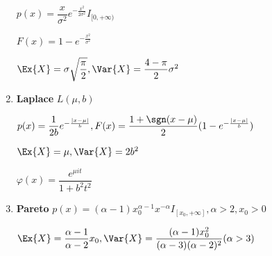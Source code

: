 \begin{enumerate}
$ p(x) = \dfrac{x}{\sigma^2}e^{-\frac{x^2}{2\sigma^2}}I_{[0,+\infty)}$

$ F(x) = 1-e^{-\frac{x^2}{\sigma^2}}$

$ \Ex{X} = \sigma\sqrt{\dfrac{\pi}{2}}, \Var{X} = \dfrac{4-\pi}{2}\sigma^2$

\item \textbf{Laplace} $ L(\mu,b)$

  $ p(x)=\dfrac{1}{2b}e^{-\frac{|x-\mu|}{b}}, F(x)=\dfrac{1+\sgn(x-\mu)}{2}(1-e^{-\frac{|x-\mu|}{b}})$

  $ \Ex{X} = \mu, \Var{X} = 2b^2$

  $ \varphi(x) = \dfrac{e^{\mu it}}{1+b^2t^2}$


\item \textbf{Pareto}
  $ p(x) = (\alpha-1)x_0^{\alpha-1}x^{-\alpha}I_{[x_0,+\infty]}, \alpha>2, x_0>0$

  $ \Ex{X} = \dfrac{\alpha-1}{\alpha-2}x_0, \Var{X} = \dfrac{(\alpha-1)x_0^2}{(\alpha-3)(\alpha-2)^2}(\alpha>3)$

  \end{enumerate}

